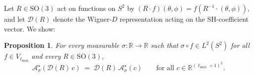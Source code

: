 \documentclass{article}
\newtheorem{proposition}{Proposition}
\begin{document}
Let $R \in \mathrm{SO}(3)$ act on functions on $S^2$ by
$(R \cdot f)(\theta,\phi) = f(R^{-1} \cdot (\theta,\phi))$, and let
$\mathcal{D}(R)$ denote the Wigner-$D$ representation acting on the
SH-coefficient vector. We show:

\begin{proposition}
For every measurable $\sigma : \mathbb{R} \to \mathbb{R}$ such that
$\sigma \circ f \in L^2(S^2)$ for all $f \in V_{\ell_{\max}}$ and
every $R \in \mathrm{SO}(3)$,
\begin{equation}
  \mathcal{A}^{\star}_\sigma(\mathcal{D}(R)\,c)
  \;=\;
  \mathcal{D}(R)\,\mathcal{A}^{\star}_\sigma(c)
  \qquad \text{for all } c \in \mathbb{R}^{(\ell_{\max}+1)^2}.
  \label{eq:exact-equivariance}
\end{equation}
\end{proposition}
\end{document}
